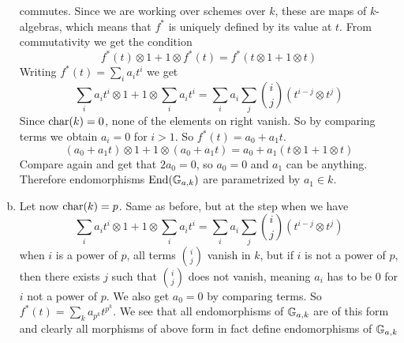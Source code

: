 \begin{exercise}{2}
\begin{enumerate}[a)]
{                commutes.
                Since we are working over schemes over $k$, these are maps of
                $k$-algebras, which means that $f^*$ is uniquely defined by its
                value at $t$.
                From commutativity we get the condition
                \begin{equation*}
                    f^*(t) \otimes 1 + 1 \otimes f^*(t) = f^*(t \otimes 1 + 1
                    \otimes t)
                \end{equation*}
                Writing $f^*(t) = \sum_i a_i t^i$ we get
                \begin{equation*}
                    \sum_i a_i t^i \otimes 1 + 1 \otimes \sum_i a_i t^i = \sum_i a_i \sum_j
                    \binom{i}{j} (t^{i-j} \otimes t^j)
                \end{equation*}
                Since $\operatorname{char}(k) = 0$, none of the elements on right
                vanish. So by comparing terms we obtain $a_i = 0$ for $i > 1$. 
                So $f^*(t) = a_0 + a_1 t$.
                \begin{equation*}
                    (a_0 + a_1 t) \otimes 1 + 1 \otimes (a_0 + a_1 t) = a_0 +
                    a_1 (t \otimes 1 + 1 \otimes t)
                \end{equation*}
                Compare again and get that $2 a_0 = 0$, so $a_0 = 0$ and $a_1$
                can be anything. Therefore endomorphisms $\operatorname{End}(\mathbb{G}_{a, k})$ are
                parametrized by $a_1 \in k$.
            }
        \item{
                Let now $\operatorname{char}(k) = p$.
                Same as before, but at the step when we have 
                \begin{equation*}
                    \sum_i a_i t^i \otimes 1 + 1 \otimes \sum_i a_i t^i = \sum_i a_i \sum_j
                    \binom{i}{j} (t^{i-j} \otimes t^j)
                \end{equation*}
                when $i$ is a power of $p$, all terms $\binom{i}{j}$ vanish in
                $k$, but if $i$ is not a power of $p$, then there exists $j$
                such that $\binom{i}{j}$ does not vanish, meaning $a_i$ has to
                be $0$ for $i$ not a power of $p$.
                We also get $a_0 = 0$ by comparing terms.
                So $f^*(t) = \sum_k a_{p^k} t^{p^k}$.
                We see that all endomorphisms of $\mathbb{G}_{a, k}$ are of this form
                and clearly all morphisms of above form in fact define
                endomorphisms of $\mathbb{G}_{a, k}$
            }
    \end{enumerate}
\end{exercise}


